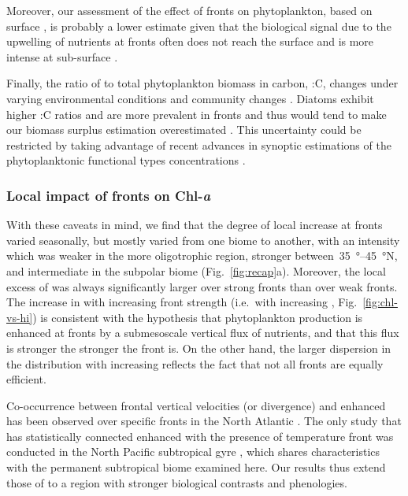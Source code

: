 Moreover, our assessment of the effect of fronts on phytoplankton, based on surface , is probably a lower estimate given that the biological signal due to the upwelling of nutrients at fronts often does not reach the surface and is more intense at sub-surface \parencite{mourino_2004, ruiz_2019}.

Finally, the ratio of  to total phytoplankton biomass in carbon, :C, changes under varying environmental conditions and community changes \parencite{behrenfeld_2015, halsey_2015, inomura_2022}.
Diatoms exhibit higher :C ratios and are more prevalent in fronts and thus would tend to make our biomass surplus estimation overestimated \parencite{treguer_2018}.
This uncertainty could be restricted by taking advantage of recent advances in synoptic estimations of the phytoplanktonic functional types concentrations \parencite{elhourany_2019}.

\subsubsection{Local impact of fronts on Chl-\emph{a}}

With these caveats in mind, we find that the degree of local  increase at fronts varied seasonally, but mostly varied from one biome to another, with an intensity which was weaker in the more oligotrophic region, stronger between~\qtyrange{35}{45}{\degree}N, and intermediate in the subpolar biome (Fig.~\ref{fig:recap}a).
Moreover, the local excess of  was always significantly larger over strong fronts than over weak fronts.
The increase in  with increasing front strength (i.e.\ with increasing , Fig.~\ref{fig:chl-vs-hi}) is consistent with the hypothesis that phytoplankton production is enhanced at fronts by a submesoscale vertical flux of nutrients, and that this flux is stronger the stronger the front is.
On the other hand, the larger dispersion in the  distribution with increasing  reflects the fact that not all fronts are equally efficient.

Co-occurrence between frontal vertical velocities (or divergence) and enhanced  has been observed over specific fronts in the North Atlantic \parencite{mourino_2004, allen_2005, lehahn_2007}.
The only study that has statistically connected enhanced  with the presence of temperature front was conducted in the North Pacific subtropical gyre \parencite{liu_2016}, which shares characteristics with the permanent subtropical biome examined here.
Our results thus extend those of \textcite{liu_2016} to a region with stronger biological contrasts and phenologies.

